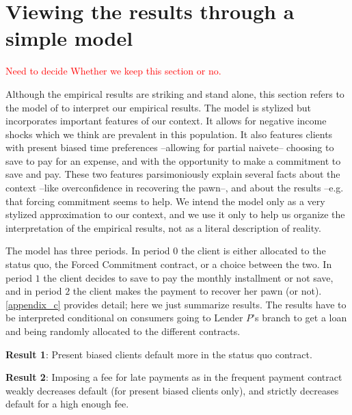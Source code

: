 \documentclass[oneside,11pt]{article}
\begin{document}
\section{Viewing the results through a simple model} \label{model}

\textcolor{red}{Need to decide Whether we keep this section or no.}

Although the empirical results are striking and stand alone, this section refers to the model of \cite{John} to interpret our empirical results. The model is stylized but incorporates important features of our context. It allows for negative income shocks which we think are prevalent in this population. %
It also features clients with present biased time preferences --allowing for partial naivete-- choosing to save to pay for an expense, and with the opportunity to make a commitment to save and pay. These two features parsimoniously explain several facts about the context --like overconfidence in recovering the pawn--, and about the results --e.g. that forcing commitment seems to help. We intend the model only as a very stylized approximation to our context, and we use it only to help us organize the interpretation of the empirical results, not as a literal description of reality. %

The model has three periods. In period $0$ the client is either allocated to the status quo, the Forced Commitment contract, or a choice between the two. In period  $1$ the client decides to save to pay the monthly installment or not save, and in period $2$ the client makes the payment to recover her pawn (or not). \ref{appendix_c} provides detail; here we just summarize results. The results have to be interpreted conditional on consumers going to Lender $P$'s branch to get a loan and being randomly allocated to the different contracts. %

\vspace{.1in}
\noindent \textbf{Result 1}: Present biased clients default more in the status quo contract.

\vspace{.1in}
\noindent \textbf{Result 2}: Imposing a fee  for late payments as in the frequent payment contract weakly decreases default (for present biased clients only), and strictly decreases default for a high enough fee. 
\end{document}

